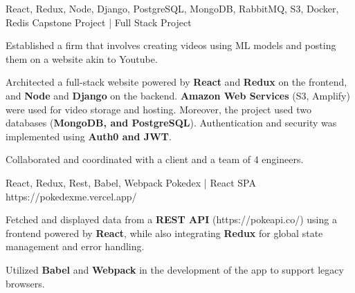 


\begin{cventries}



\cventry
{React, Redux, Node, Django, PostgreSQL, MongoDB, RabbitMQ, S3, Docker, Redis } %
{Capstone Project | Full Stack Project }  %
{} %
{}
{
	\begin{cvitems} %
		\item {Established a firm that involves creating videos using ML models and posting them on a website akin to Youtube.}
		\item {Architected a full-stack website powered by \textbf{React} and \textbf{Redux} on the frontend, and \textbf{Node} and \textbf{Django} on the backend. \textbf{Amazon Web Services} (S3, Amplify) were used for video storage and hosting. Moreover, the project used two databases (\textbf{MongoDB, and PostgreSQL}). Authentication and security was implemented using \textbf{Auth0 and JWT}.}
		\item {Collaborated and coordinated with a client and a team of 4 engineers.}
	\end{cvitems}
}

\cventry
{React, Redux, Rest, Babel, Webpack } %
{Pokedex | React SPA }  %
{https://pokedexme.vercel.app/ } %
{}
{
	\begin{cvitems} %
		\item {Fetched and displayed data from a \textbf{REST API} (https://pokeapi.co/) using a frontend powered by \textbf{React}, while also integrating \textbf{Redux}  for global state management and error handling.}
		\item {Utilized \textbf{Babel} and \textbf{Webpack}  in the development of the app to support legacy browsers.}
	\end{cvitems}
}


\end{cventries}
